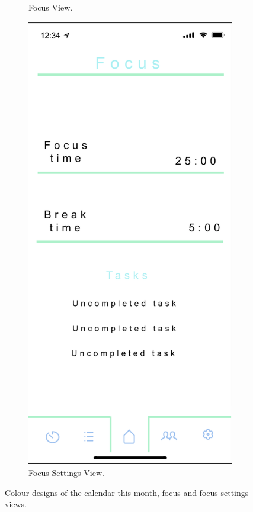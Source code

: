 \begin{figure}[H]
\begin{subfigure}[b]{0.3\textwidth}
        \caption{Focus View.}
        \label{fig:focus_colour}
    \end{subfigure}
    \hfill
    \begin{subfigure}[b]{0.3\textwidth}
        \centering
        \includegraphics[width=\textwidth]{./graphics/design/Focus Settings Colour.png}
        \caption{Focus Settings View.}
        \label{fig:focus_settings_colour}
    \end{subfigure}
    
    \caption{Colour designs of the calendar this month, focus and focus settings views.}
    \label{fig:calthismonth_focus_focussettings_colour}
\end{figure}

